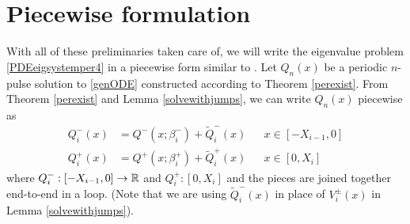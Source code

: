 \documentclass[thesis.tex]{subfiles}
\begin{document}
\section{Piecewise formulation}\label{sec:perpiece}

With all of these preliminaries taken care of, we will write the eigenvalue problem \cref{PDEeigsystemper4} in a piecewise form similar to \cite{Sandstede1998}. Let $Q_n(x)$ be a periodic $n$-pulse solution to \eqref{genODE} constructed according to Theorem \ref{perexist}. From Theorem \ref{perexist} and Lemma \ref{solvewithjumps}, we can write $Q_n(x)$ piecewise as
\begin{equation}\label{Qnppiece}
\begin{aligned}
Q_i^-(x) &= Q^-(x; \beta_i^-) + \tilde{Q}_i^-(x) && x \in [-X_{i-1}, 0] \\
Q_i^+(x) &= Q^+(x; \beta_i^+) + \tilde{Q}_i^+(x) && x \in [0, X_i]
\end{aligned}
\end{equation}
where $Q_i^-: [-X_{i-1}, 0] \rightarrow \mathbb{R}$ and $Q_i^+: [0, X_i]$ and the pieces are joined together end-to-end in a loop. (Note that we are using $\tilde{Q}_i^-(x)$ in place of $V_i^\pm(x)$ in Lemma \ref{solvewithjumps}).
\end{document}
